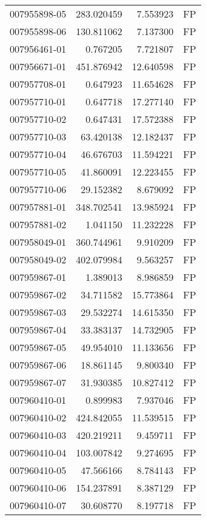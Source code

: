 \begin{tabular}{lrrl}
007955898-05 &  283.020459 &     7.553923 &   FP \\
007955898-06 &  130.811062 &     7.137300 &   FP \\
007956461-01 &    0.767205 &     7.721807 &   FP \\
007956671-01 &  451.876942 &    12.640598 &   FP \\
007957708-01 &    0.647923 &    11.654628 &   FP \\
007957710-01 &    0.647718 &    17.277140 &   FP \\
007957710-02 &    0.647431 &    17.572388 &   FP \\
007957710-03 &   63.420138 &    12.182437 &   FP \\
007957710-04 &   46.676703 &    11.594221 &   FP \\
007957710-05 &   41.860091 &    12.223455 &   FP \\
007957710-06 &   29.152382 &     8.679092 &   FP \\
007957881-01 &  348.702541 &    13.985924 &   FP \\
007957881-02 &    1.041150 &    11.232228 &   FP \\
007958049-01 &  360.744961 &     9.910209 &   FP \\
007958049-02 &  402.079984 &     9.563257 &   FP \\
007959867-01 &    1.389013 &     8.986859 &   FP \\
007959867-02 &   34.711582 &    15.773864 &   FP \\
007959867-03 &   29.532274 &    14.615350 &   FP \\
007959867-04 &   33.383137 &    14.732905 &   FP \\
007959867-05 &   49.954010 &    11.133656 &   FP \\
007959867-06 &   18.861145 &     9.800340 &   FP \\
007959867-07 &   31.930385 &    10.827412 &   FP \\
007960410-01 &    0.899983 &     7.937046 &   FP \\
007960410-02 &  424.842055 &    11.539515 &   FP \\
007960410-03 &  420.219211 &     9.459711 &   FP \\
007960410-04 &  103.007842 &     9.274695 &   FP \\
007960410-05 &   47.566166 &     8.784143 &   FP \\
007960410-06 &  154.237891 &     8.387129 &   FP \\
007960410-07 &   30.608770 &     8.197718 &   FP \\

\end{tabular}
